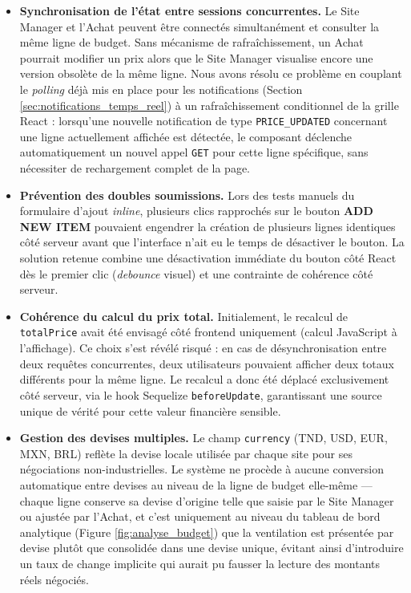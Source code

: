 \begin{itemize}
    \item \textbf{Synchronisation de l'état entre sessions concurrentes.} Le Site Manager et l'Achat peuvent être connectés simultanément et consulter la même ligne de budget. Sans mécanisme de rafraîchissement, un Achat pourrait modifier un prix alors que le Site Manager visualise encore une version obsolète de la même ligne. Nous avons résolu ce problème en couplant le \textit{polling} déjà mis en place pour les notifications (Section \ref{sec:notifications_temps_reel}) à un rafraîchissement conditionnel de la grille React : lorsqu'une nouvelle notification de type \texttt{PRICE\_UPDATED} concernant une ligne actuellement affichée est détectée, le composant déclenche automatiquement un nouvel appel \texttt{GET} pour cette ligne spécifique, sans nécessiter de rechargement complet de la page.
    \item \textbf{Prévention des doubles soumissions.} Lors des tests manuels du formulaire d'ajout \textit{inline}, plusieurs clics rapprochés sur le bouton \textbf{ADD NEW ITEM} pouvaient engendrer la création de plusieurs lignes identiques côté serveur avant que l'interface n'ait eu le temps de désactiver le bouton. La solution retenue combine une désactivation immédiate du bouton côté React dès le premier clic (\textit{debounce} visuel) et une contrainte de cohérence côté serveur.
    \item \textbf{Cohérence du calcul du prix total.} Initialement, le recalcul de \texttt{totalPrice} avait été envisagé côté frontend uniquement (calcul JavaScript à l'affichage). Ce choix s'est révélé risqué : en cas de désynchronisation entre deux requêtes concurrentes, deux utilisateurs pouvaient afficher deux totaux différents pour la même ligne. Le recalcul a donc été déplacé exclusivement côté serveur, via le hook Sequelize \texttt{beforeUpdate}, garantissant une source unique de vérité pour cette valeur financière sensible.
    \item \textbf{Gestion des devises multiples.} Le champ \texttt{currency} (TND, USD, EUR, MXN, BRL) reflète la devise locale utilisée par chaque site pour ses négociations non-industrielles. Le système ne procède à aucune conversion automatique entre devises au niveau de la ligne de budget elle-même — chaque ligne conserve sa devise d'origine telle que saisie par le Site Manager ou ajustée par l'Achat, et c'est uniquement au niveau du tableau de bord analytique (Figure \ref{fig:analyse_budget}) que la ventilation est présentée par devise plutôt que consolidée dans une devise unique, évitant ainsi d'introduire un taux de change implicite qui aurait pu fausser la lecture des montants réels négociés.
\end{itemize}

